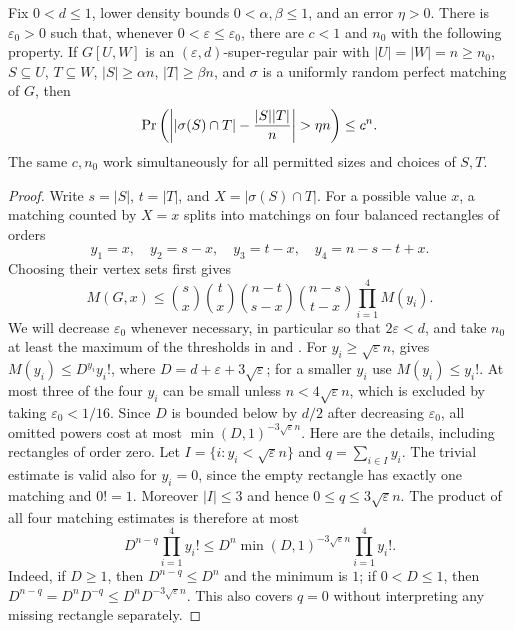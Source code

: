 \begin{lemma}
Fix $0<d\le1$, lower density bounds $0<\alpha,\beta\le1$, and an error $\eta>0$.  There is $\varepsilon_0>0$ such that, whenever $0<\varepsilon\le\varepsilon_0$, there are $c<1$ and $n_0$ with the following property.  If $G[U,W]$ is an $(\varepsilon,d)$-super-regular pair with $|U|=|W|=n\ge n_0$, $S\subseteq U$, $T\subseteq W$, $|S|\ge\alpha n$, $|T|\ge\beta n$, and $\sigma$ is a uniformly random perfect matching of $G$, then
\[
 \Pr\left(\left||\sigma(S)\cap T|-{|S||T|\over n}\right|>\eta n\right)\le c^n.
\]
The same $c,n_0$ work simultaneously for all permitted sizes and choices of $S,T$.
\end{lemma}
\begin{proof}
Write $s=|S|$, $t=|T|$, and $X=|\sigma(S)\cap T|$.  For a possible value $x$, a matching counted by $X=x$ splits into matchings on four balanced rectangles of orders
\[
 y_1=x,\quad y_2=s-x,\quad y_3=t-x,\quad y_4=n-s-t+x.
\]
Choosing their vertex sets first gives
\[
 M(G,x)\le {s\choose x}{t\choose x}{n-t\choose s-x}{n-s\choose t-x}
             \prod_{i=1}^4 M(y_i).                                 \tag{1}
\]
We will decrease $\varepsilon_0$ whenever necessary, in particular so that
$2\varepsilon<d$, and take $n_0$ at least the maximum of the thresholds in
 and .
For $y_i\ge\sqrt\varepsilon n$,  gives
$M(y_i)\le D^{y_i}y_i!$, where $D=d+\varepsilon+3\sqrt\varepsilon$; for a smaller $y_i$ use $M(y_i)\le y_i!$.  At most three of the four $y_i$ can be small unless $n<4\sqrt\varepsilon n$, which is excluded by taking $\varepsilon_0<1/16$.  Since $D$ is bounded below by $d/2$ after decreasing $\varepsilon_0$, all omitted powers cost at most
$\min(D,1)^{-3\sqrt\varepsilon n}$.  Here are the details, including rectangles
of order zero.  Let $I=\{i:y_i<\sqrt\varepsilon n\}$ and
$q=\sum_{i\in I}y_i$.  The trivial estimate is valid also for $y_i=0$, since
the empty rectangle has exactly one matching and $0!=1$.  Moreover
$|I|\le3$ and hence $0\le q\le3\sqrt\varepsilon n$.  The product of all four
matching estimates is therefore at most
\[
 D^{n-q}\prod_{i=1}^4y_i!
 \le D^n\min(D,1)^{-3\sqrt\varepsilon n}\prod_{i=1}^4y_i! .
\]
Indeed, if $D\ge1$, then $D^{n-q}\le D^n$ and the minimum is $1$; if
$0<D\le1$, then
$D^{n-q}=D^nD^{-q}\le D^nD^{-3\sqrt\varepsilon n}$.  This also covers
$q=0$ without interpreting any missing rectangle separately.


\end{proof}
